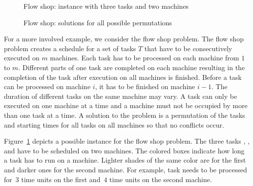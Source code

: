 \begin{example}\label{ex:dl:fs}

\begin{figure}[ht]
\centering
{\def\svgscale{.4}
}
\caption{Flow shop: instance with three tasks and two machines\label{fig:fs:ins}}
\end{figure}
\begin{figure}[ht]
\centering
{\def\svgwidth{\linewidth}
}
\caption{Flow shop: solutions for all possible permutations\label{fig:fs:sol}}
\end{figure}
%
For a more involved example, we consider the flow shop problem.
The flow shop problem creates a schedule for a set of tasks $T$ that have to be consecutively executed on $m$ machines.
%
Each task has to be processed on each machine from $1$ to $m$. 
Different parts of one task are completed on each machine resulting in the completion of the task after execution on all machines is finished.
Before a task can be processed on machine $i$, it has to be finished on machine $i-1$.
The duration of different tasks on the same machine may vary.
A task can only be executed on one machine at a time and
a machine must not be occupied by more than one task at a time.
%
A solution to the problem is a permutation of the tasks and starting times for all tasks on all machines so that no conflicts occur.

Figure~\ref{fig:fs:ins} depicts a possible instance for the flow shop problem.
The three tasks , , and  have to be scheduled on two machines.
The colored boxes indicate how long a task has to run on a machine.
Lighter shades of the same color are for the first and darker ones for the second machine.
For example, task  needs to be processed for~$3$ time units on the first and~$4$ time units on the second machine.


\end{example}
